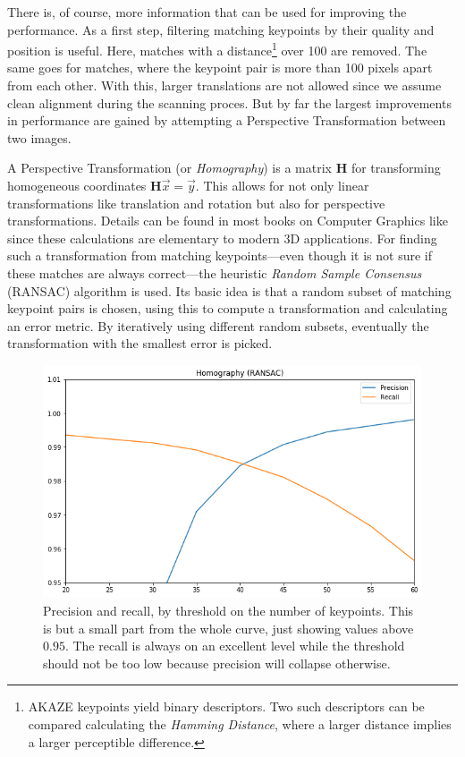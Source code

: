 \documentclass{ltjarticle}
\begin{document}
There is, of course, more information that can be used for improving the performance. As a first step, filtering matching keypoints by their quality and position is useful. Here, matches with a distance\footnote{AKAZE keypoints yield binary descriptors. Two such descriptors can be compared calculating the \emph{Hamming Distance}, where a larger distance implies a larger perceptible difference.} over 100 are removed. The same goes for matches, where the keypoint pair is more than 100 pixels apart from each other. With this, larger translations are not allowed since we assume clean alignment during the scanning proces. But by far the largest improvements in performance are gained by attempting a Perspective Transformation between two images.

A Perspective Transformation (or \emph{Homography}) is a matrix $\bm{H}$ for transforming homogeneous coordinates $\bm{H}\vec{x} = \vec{y}$. This allows for not only linear transformations like translation and rotation but also for perspective transformations. Details can be found in most books on Computer Graphics like \cite{marschner2015fundamentals} since these calculations are elementary to modern 3D applications. For finding such a transformation from matching keypoints---even though it is not sure if these matches are always correct---the heuristic \emph{Random Sample Consensus} (RANSAC) algorithm is used.\cite{fischler1981random} Its basic idea is that a random subset of matching keypoint pairs is chosen, using this to compute a transformation and calculating an error metric. By iteratively using different random subsets, eventually the transformation with the smallest error is picked. 

\begin{figure}
    \centering
    \includegraphics[width=\linewidth]{ransac-performance.png}
    \caption{Precision and recall, by threshold on the number of keypoints. This is but a small part from the whole curve, just showing values above $0.95$. The recall is always on an excellent level while the threshold should not be too low because precision will collapse otherwise.}
    \label{fig:ransac}
\end{figure}
\end{document}
